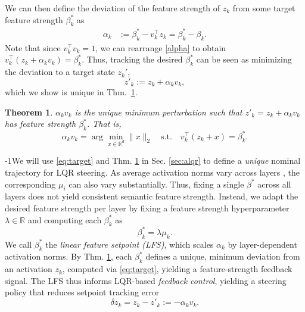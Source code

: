 \documentclass{article}
\newcommand{\bR}{\mathbb{R}}
\theoremstyle{plain}
\newtheorem{theorem}{Theorem}[section]
\theoremstyle{definition}
\theoremstyle{remark}
\begin{document}
We can then define the deviation of the feature strength of $z_k$ from some target feature strength $\beta_k^*$ as
\begin{equation}\label{alpha}
    \begin{aligned}
        \alpha_k &:= \beta^*_k - v_k^\top z_k =\beta^*_k - \beta_k.
    \end{aligned}
\end{equation}
Note that since $v_k^\top v_k = 1$, we can rearrange \eqref{alpha} to obtain 
    $v_k^{\top}(z_k + \alpha_k v_k) = \beta^*_k$.
Thus, tracking the desired $\beta_k^*$ can be seen as minimizing the deviation to a target state $z_k'$,
\begin{equation}\label{eq:target}
    z'_k := z_k + \alpha_k v_k,
\end{equation}
which we show is unique in Thm.~\ref{min_pert}. 

\begin{theorem}\label{min_pert}
    $\alpha_k v_k$ is the unique minimum perturbation such that $z'_k = z_k + \alpha_k v_k$ has feature strength $\beta^*_k$. That is, 
    \begin{equation}\label{eq:unique}
    \alpha_k v_k = \arg\min_{x \in \mathbb{R}^d} \|x\|_2 \quad \text{s.t.} \quad v_k^\top (z_k + x) = \beta_k^*.
    \end{equation}
\end{theorem}
\vspace{-10pt}

\looseness-1We will use \eqref{eq:target} and Thm. \ref{min_pert} in Sec. \ref{sec:alqr} to define a \textit{unique} nominal trajectory for LQR steering.
As average activation norms vary across layers \cite{Vu_Nguyen_2025}, the corresponding $\mu_i$ can also vary substantially. Thus, fixing a single $\beta^*$ across all layers does not yield consistent semantic feature strength. Instead, we adapt the desired feature strength per layer by fixing a feature strength hyperparameter $\lambda \in \bR$ and computing each $\beta^*_k$ as
\begin{equation}\label{eq:lfs}
    \beta^*_k = \lambda \mu_k.
\end{equation}
We call $\beta^*_k$ the \textit{linear feature setpoint (LFS)}, which scales $\alpha_k$ by layer-dependent activation norms. By Thm. \ref{min_pert}, each $\beta^*_k$ defines a unique, minimum deviation from an activation $z_k$, computed via \eqref{eq:target}, yielding a feature-strength feedback signal.
The LFS thus informs LQR-based \textit{feedback control}, yielding a steering policy that reduces setpoint tracking error 
\begin{equation}\label{lfs_delta}
    \delta z_k = z_k - z'_k := -\alpha_k v_k.
\end{equation}
\end{document}
